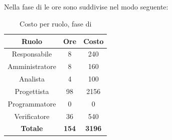 \subsection{\PD}
Nella fase di \PD{} le ore sono suddivise nel modo seguente:
\begin{table}[H]
	\centering
	\begin{tabular}{|c|c|c|}
		\hline
		\textbf{Ruolo} &
		\textbf{Ore} &
		\textbf{Costo} \\
		\hline
		Responsabile & 8 & 240 \\
		\hline
		Amministratore & 8 & 160 \\
		\hline
		Analista & 4 & 100\\
		\hline
		Progettista & 98 & 2156 \\
		\hline
		Programmatore & 0 & 0 \\
		\hline
		Verificatore & 36 & 540 \\
		\hline
		\textbf{Totale} & \textbf{154} & \textbf{3196} \\
		\hline
	\end{tabular}
	\caption{Costo per ruolo, fase di \PD}
\end{table}

